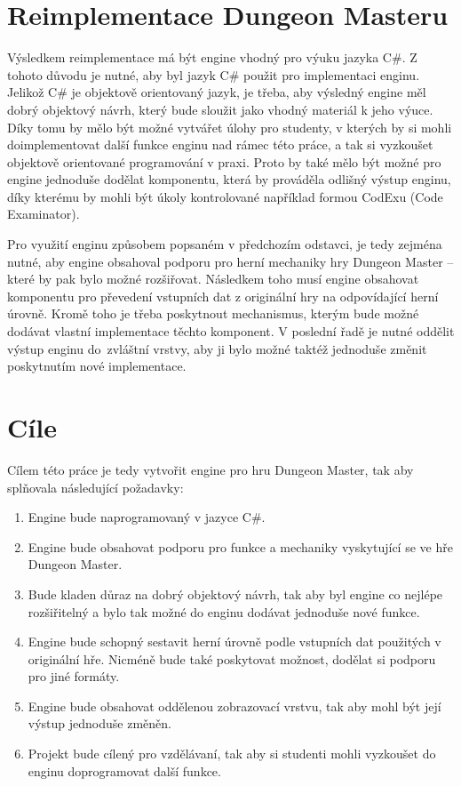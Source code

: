 
\section{Reimplementace Dungeon Masteru}

Výsledkem reimplementace má být engine vhodný pro výuku jazyka C\#. Z tohoto důvodu je nutné, aby byl jazyk C\#
použit pro implementaci enginu. Jelikož C\# je objektově orientovaný jazyk,
je třeba, aby výsledný engine měl dobrý objektový návrh, který bude sloužit jako vhodný materiál k jeho výuce. 
Díky tomu by mělo být možné vytvářet úlohy pro studenty, v kterých by si mohli doimplementovat další funkce enginu nad rámec této práce,
a tak si vyzkoušet objektově orientované programování v praxi. Proto by také mělo být možné
pro engine jednoduše dodělat komponentu, která by prováděla odlišný výstup enginu, díky kterému by mohli být 
úkoly kontrolované například formou CodExu (Code Examinator).

Pro využití enginu způsobem popsaném v předchozím odstavci, je tedy zejména nutné, aby engine obsahoval
podporu pro herní mechaniky hry Dungeon Master -- které by pak bylo možné rozšiřovat.  Následkem toho musí engine obsahovat komponentu 
pro převedení vstupních dat z originální hry na odpovídající herní úrovně. Kromě toho je třeba poskytnout mechanismus,
kterým bude možné dodávat vlastní implementace těchto komponent. V poslední řadě je nutné oddělit výstup enginu do~zvláštní vrstvy,
aby ji bylo možné taktéž jednoduše změnit poskytnutím nové implementace. 

\section{Cíle}

Cílem této práce je tedy vytvořit engine pro hru Dungeon Master, tak aby splňovala následující požadavky:
\begin{enumerate}[label=\textbf{C\arabic*}]
\item Engine bude naprogramovaný v jazyce C\#.
\item\label{aim-mechanics} Engine bude obsahovat podporu pro funkce a mechaniky vyskytující se ve hře Dungeon Master.
\item\label{aim-extensibility} Bude kladen důraz na dobrý objektový návrh, tak aby byl engine co nejlépe rozšiřitelný a bylo 
	tak možné do enginu dodávat jednoduše nové funkce.
\item\label{aim-builders} Engine bude schopný sestavit herní úrovně podle vstupních dat použitých v originální hře. Nicméně
	bude také poskytovat možnost, dodělat si podporu pro jiné formáty.
\item\label{aim-rendering} Engine bude obsahovat oddělenou zobrazovací vrstvu, tak aby mohl být její výstup jednoduše změněn.
\item Projekt bude cílený pro vzdělávaní, tak aby si studenti mohli vyzkoušet do enginu doprogramovat další funkce.
\end{enumerate}
